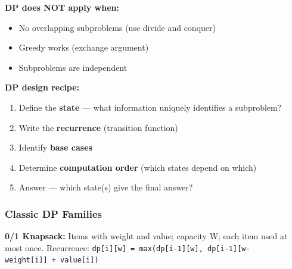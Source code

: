\documentclass[11pt]{article}
\providecommand{\tightlist}{\setlength{\itemsep}{1pt}\setlength{\parskip}{0pt}}
\begin{document}
\textbf{DP does NOT apply when:}

\begin{itemize}
\tightlist
\item
  No overlapping subproblems (use divide and conquer)
\item
  Greedy works (exchange argument)
\item
  Subproblems are independent
\end{itemize}

\textbf{DP design recipe:}

\begin{enumerate}
\def\labelenumi{\arabic{enumi}.}
\tightlist
\item
  Define the \textbf{state} --- what information uniquely identifies a subproblem?
\item
  Write the \textbf{recurrence} (transition function)
\item
  Identify \textbf{base cases}
\item
  Determine \textbf{computation order} (which states depend on which)
\item
  Answer --- which state(s) give the final answer?
\end{enumerate}

\subsubsection{Classic DP Families}\label{classic-dp-families}

\textbf{0/1 Knapsack:}
Items with weight and value; capacity W; each item used at most once.
Recurrence: \texttt{dp{[}i{]}{[}w{]}\ =\ max(dp{[}i-1{]}{[}w{]},\ dp{[}i-1{]}{[}w-weight{[}i{]}{]}\ +\ value{[}i{]})}

\end{document}
